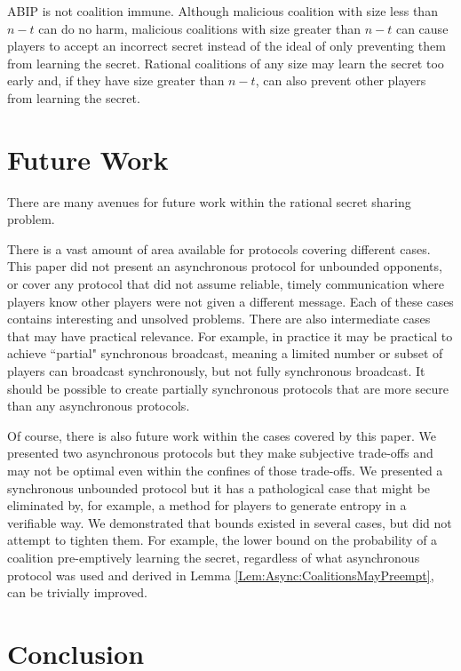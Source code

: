 \documentclass{dalcsthesis}
\begin{document}
ABIP is not coalition immune. Although malicious coalition with size less than $n-t$ can do no harm, malicious coalitions with size greater than $n-t$ can cause players to accept an incorrect secret instead of the ideal of only preventing them from learning the secret. Rational coalitions of any size may learn the secret too early and, if they have size greater than $n-t$, can also prevent other players from learning the secret.




\chapter{Future Work}

There are many avenues for future work within the rational secret sharing problem.

There is a vast amount of area available for protocols covering different cases. This paper did not present an asynchronous protocol for unbounded opponents, or cover any protocol that did not assume reliable, timely communication where players know other players were not given a different message. Each of these cases contains interesting and unsolved problems. There are also intermediate cases that may have practical relevance. For example, in practice it may be practical to achieve ``partial" synchronous broadcast, meaning a limited number or subset of players can broadcast synchronously, but not fully synchronous broadcast. It should be possible to create partially synchronous protocols that are more secure than any asynchronous protocols.

Of course, there is also future work within the cases covered by this paper. We presented two asynchronous protocols but they make subjective trade-offs and may not be optimal even within the confines of those trade-offs. We presented a synchronous unbounded protocol but it has a pathological case that might be eliminated by, for example, a method for players to generate entropy in a verifiable way. We demonstrated that bounds existed in several cases, but did not attempt to tighten them. For example, the lower bound on the probability of a coalition pre-emptively learning the secret, regardless of what asynchronous protocol was used and derived in Lemma \ref{Lem:Async:CoalitionsMayPreempt}, can be trivially improved.




\chapter{Conclusion}
\end{document}
